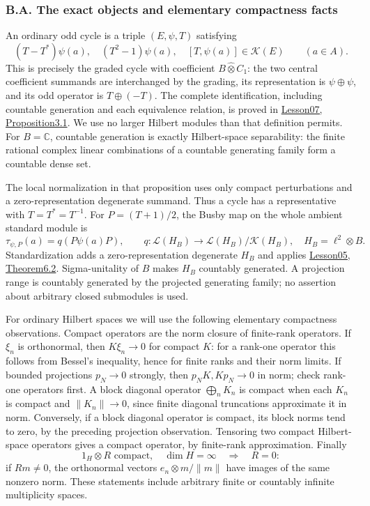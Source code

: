 \documentclass[
  11pt,
]{article}
\begin{document}
\subsubsection{B.A. The exact objects and elementary compactness
facts}\label{b.a.-the-exact-objects-and-elementary-compactness-facts}

An ordinary odd cycle is a triple \((E,\psi,T)\) satisfying \[
(T-T^*)\psi(a),\quad (T^2-1)\psi(a),\quad[T,\psi(a)]
\in\mathcal K(E)\qquad(a\in A).
\tag{B.A.3}
\] This is precisely the graded cycle with coefficient
\(B\widehat\otimes C_1\): the two central coefficient summands are
interchanged by the grading, its representation is \(\psi\oplus\psi\),
and its odd operator is \(T\oplus(-T)\). The complete identification,
including countable generation and each equivalence relation, is proved
in \href{KT-KK-07.html\#3-the-odd-scalar-picture}{Lesson07,
Proposition3.1}. We use no larger Hilbert modules than that definition
permits. For \(B=\mathbb C\), countable generation is exactly
Hilbert-space separability: the finite rational complex linear
combinations of a countable generating family form a countable dense
set.

The local normalization in that proposition uses only compact
perturbations and a zero-representation degenerate summand. Thus a cycle
has a representative with \(T=T^*=T^{-1}\). For \(P=(T+1)/2\), the Busby
map on the whole ambient standard module is \[
\tau_{\psi,P}(a)=q(P\psi(a)P),\qquad
q:\mathcal L(H_B)\longrightarrow\mathcal L(H_B)/\mathcal K(H_B),
\quad H_B=\ell^2\otimes B.
\tag{B.A.4}
\] Standardization adds a zero-representation degenerate \(H_B\) and
applies \href{KT-KK-05.html\#theorem-6-2-graded-stabilization}{Lesson05,
Theorem6.2}. Sigma-unitality of \(B\) makes \(H_B\) countably generated.
A projection range is countably generated by the projected generating
family; no assertion about arbitrary closed submodules is used.

For ordinary Hilbert spaces we will use the following elementary
compactness observations. Compact operators are the norm closure of
finite-rank operators. If \(\xi_n\) is orthonormal, then \(K\xi_n\to0\)
for compact \(K\): for a rank-one operator this follows from Bessel's
inequality, hence for finite ranks and their norm limits. If bounded
projections \(p_N\to0\) strongly, then \(p_NK,Kp_N\to0\) in norm; check
rank-one operators first. A block diagonal operator \(\bigoplus_nK_n\)
is compact when each \(K_n\) is compact and \(\|K_n\|\to0\), since
finite diagonal truncations approximate it in norm. Conversely, if a
block diagonal operator is compact, its block norms tend to zero, by the
preceding projection observation. Tensoring two compact Hilbert-space
operators gives a compact operator, by finite-rank approximation.
Finally \[
1_H\otimes R\text{ compact},\quad \dim H=\infty
\quad\Longrightarrow\quad R=0:
\tag{B.A.5}
\] if \(Rm\ne0\), the orthonormal vectors \(e_n\otimes m/\|m\|\) have
images of the same nonzero norm. These statements include arbitrary
finite or countably infinite multiplicity spaces.
\end{document}
